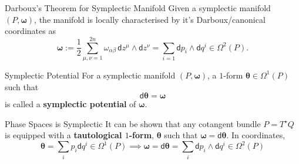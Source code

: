 \documentclass{beamer}
\begin{document}
\begin{frame}{}
  \begin{alertblock}{Darboux's Theorem for Symplectic Manifold}
    Given a symplectic manifold \((P, \boldsymbol{\omega})\), the manifold is locally characterised by it's Darboux/canonical coordinates as
    \begin{equation}
      \boldsymbol{\omega} := \frac{1}{2} \sum _{\mu, \nu = 1} ^{2n} \omega _{\alpha \beta} \, \mathsf{d} z ^{\mu} \wedge \mathsf{d} z ^{\nu} = \sum _{i = 1} \mathsf{d} p _{i} \wedge \mathsf{d} q ^{i} \in \Omega ^{2} (P).
    \end{equation}
  \end{alertblock}
\end{frame}

\begin{frame}{}
  \begin{block}{Symplectic Potential}
    For a symplectic manifold \((P, \boldsymbol{\omega})\), a \(1\)-form \(\boldsymbol{\theta} \in \Omega ^{1} (P)\) such that
    \begin{equation}
      \mathsf{d} \boldsymbol{\theta} = \boldsymbol{\omega}
    \end{equation} is called a \textbf{symplectic potential} of \(\boldsymbol{\omega}\).
  \end{block}
  \begin{alertblock}{Phase Spaces is Symplectic}
  It can be shown that any cotangent bundle \(P = T ^{\star} Q\) is equipped with a \textbf{tautological \(1\)-form}, \(\boldsymbol{\theta}\) such that \(\boldsymbol{\omega} = \mathsf{d} \boldsymbol{\theta}\).
  In coordinates,
    \begin{equation}
      \boldsymbol{\theta} = \sum _{i} p _{i} \mathsf{d} q ^{i} \in \Omega ^{1} (P) \implies \boldsymbol{\omega} = \mathsf{d} \boldsymbol{\theta} = \sum _{i} \mathsf{d} p _{i} \wedge \mathsf{d} q ^{i} \in \Omega ^{2} (P)
    \end{equation}
  \end{alertblock}
\end{frame}

\end{document}
